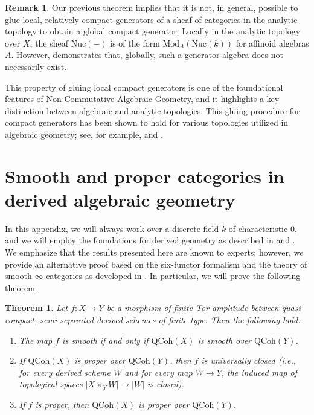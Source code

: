 \documentclass[oneside, hidelinks, 12pt, a4paper,reqno]{amsart}
\theoremstyle{plain}
\newtheorem{theorem}{Theorem}[section]
\theoremstyle{definition}
\newtheorem{remark}[remark]{Remark}
\theoremstyle{plain}
\newcommand{\rL}{\mathrm L}
\newcommand{\cat}{$\infty$-category }
\newcommand{\cates}{$\infty$-categories }
\newcommand{\LPr}{\mathrm{Pr}^\rL}
\newcommand{\Nuc}{\mathrm{Nuc}}
\newcommand{\Qcoh}{\mathrm{QCoh}}
\newcommand{\Mod}{\mathrm{Mod}}
\begin{document}
\begin{remark}
    Our previous theorem implies that it is not, in general, possible to glue local, relatively compact generators of a sheaf of categories in the analytic topology to obtain a global compact generator. Locally in the analytic topology over $X$, the sheaf $\Nuc(-)$ is of the form $\Mod_{A}(\Nuc(k))$ for affinoid algebras $A$. However,  demonstrates that, globally, such a generator algebra does not necessarily exist.
    
    This property of gluing local compact generators is one of the foundational features of Non-Commutative Algebraic Geometry, and it highlights a key distinction between algebraic and analytic topologies. This gluing procedure for compact generators has been shown to hold for various topologies utilized in algebraic geometry; see, for example, \cite{toen2007moduliobjectsdgcategories} and \cite{bondal2002generatorsrepresentabilityfunctorscommutative}.
\end{remark}
\appendix
\section{Smooth and proper categories in derived algebraic geometry}\label{Appendix 1}

In this appendix, we will always work over a discrete field $k$ of characteristic $0$, and we will employ the foundations for derived geometry as described in \cite{SAG} and \cite{hag}. We emphasize that the results presented here are known to experts; however, we provide an alternative proof based on the six-functor formalism and the theory of smooth \cates as developed in . In particular, we will prove the following theorem.

\begin{theorem}\label{thm: smooth and proper cat in alg geo}
    Let $f \colon X \to Y$ be a morphism of finite Tor-amplitude between quasi-compact, semi-separated derived schemes of finite type. Then the following hold:
    \begin{enumerate}
        \item The map $f$ is smooth if and only if $\mathrm{QCoh}(X)$ is smooth over $\Qcoh(Y)$.
        \item If $\mathrm{QCoh}(X)$ is proper over $\Qcoh(Y)$, then $f$ is universally closed (i.e., for every derived scheme $W$ and for every map $W \to Y$, the induced map of topological spaces $|X\times_{Y}W| \to |W|$ is closed).
        \item If $f$ is proper, then $\mathrm{QCoh}(X)$ is proper over $\Qcoh(Y)$.
    \end{enumerate}
\end{theorem}
\end{document}
